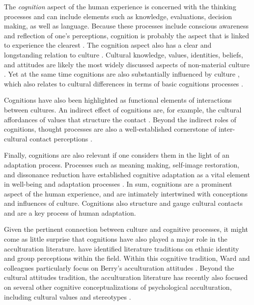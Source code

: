 \documentclass[nobib]{tufte-handout}
\begin{document}
The \textit{cognition} aspect of the human experience is concerned with the thinking processes and can include elements such as knowledge, evaluations, decision making, as well as language. Because these processes include conscious awareness and reflection of one's perceptions, cognition is probably the aspect that is linked to experience the clearest \citep{Jacobs1998}. The cognition aspect also has a clear and longstanding relation to culture . Cultural knowledge, values, identities, beliefs, and attitudes are likely the most widely discussed aspects of non-material culture \citep[e.g.,][]{DiMaggio1997}. Yet at the same time cognitions are also substantially influenced by culture \citep[e.g., through social norms][]{Gelfand2011}, which also relates to cultural differences in terms of basic cognitions processes \citep{Nisbett2002}.

Cognitions have also been highlighted as functional elements of interactions between cultures. An indirect effect of cognitions are, for example, the cultural affordances of values that structure the contact \citep[e.g.,][]{Ramstead2016}. Beyond the indirect roles of cognitions, thought processes are also a well-established cornerstone of inter-cultural contact perceptions \citep[e.g., out-group attitudes;][]{Stephan2000a}.

Finally, cognitions are also relevant if one considers them in the light of an adaptation process. Processes such as meaning making, self-image restoration, and dissonance reduction have established cognitive adaptation as a vital element in well-being and adaptation processes \citep[e.g.,][]{Czajkowska2017}. In sum, cognitions are a prominent aspect of the human experience, and are intimately intertwined with conceptions and influences of culture. Cognitions also structure and gauge cultural contacts and are a key process of human adaptation.

Given the pertinent connection between culture and cognitive processes, it might come as little surprise that cognitions have also played a major role in the acculturation literature. \citet{Ward2001} have identified literature traditions on ethnic identity and group perceptions within the field. Within this cognitive tradition, Ward and colleagues particularly focus on Berry's \citeyear{Berry1997b} acculturation attitudes \citep{Ward2019}. Beyond the cultural attitudes tradition, the acculturation literature has recently also focused on several other cognitive conceptualizations of psychological acculturation, including cultural values \citep[e.g.,]{Marin2003} and stereotypes \citep[e.g.,][]{Stanciu2018}. 
\end{document}
